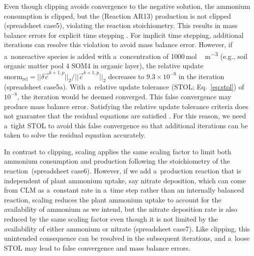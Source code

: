 \documentclass[gmdd, online, hvmath]{copernicus}
\begin{document}
      Even though clipping avoids convergence to the negative solution, the
      ammonium consumption is clipped, but the   (Reaction AR13) production is
      not clipped (spreadsheet case5), violating the reaction
      stoichiometry. This results in mass balance errors for explicit time
      stepping \citep{Tang2015}. For implicit time stepping, additional
      iterations can resolve this violation to avoid mass balance error.
      However, if a~nonreactive species is added with a~concentration of
      1000\,\unit{mol\,m^{-3}} (e.g., soil organic matter pool 4 SOM4 in
      organic layer), the relative update $\text{snorm}_{\text{rel}}= {\vert\vert
      \delta \vec{c}^{k+1,p} \vert\vert_2} / {\vert\vert \vec{c}^{k+1,p} \vert\vert
      _2}$ decreases to $9.3\times 10^{-9}$ in the iteration (spreadsheet
      case5a). With a~relative update tolerance (STOL; Eq.~\ref{eq:stol}) of
      $10^{-8}$, the iteration would be deemed converged. This false
      convergence may produce mass balance error. Satisfying the relative
      update tolerance criteria does not guarantee that the residual
      equations are satisfied \citep{Lichtner2015}. For this reason, we need
      a~tight STOL to avoid this false convergence so that additional
      iterations can be taken to solve the residual equation accurately.

      In contrast to clipping, scaling applies the same scaling factor to
      limit both ammonium consumption and  production following
      the stoichiometry of the reaction~(spreadsheet case6). However, if we
      add a~production reaction that is independent of plant ammonium
      uptake, say nitrate deposition, which can come from CLM as a~constant
      rate in a~time step rather than an internally balanced reaction,
      scaling reduces the plant ammonium uptake to account for the
      availability of ammonium as we intend, but the nitrate deposition rate
      is also reduced by the same scaling factor even though it is not
      limited by the availability of either ammonium or nitrate (spreadsheet
      case7). Like clipping, this unintended consequence can be resolved in
      the subsequent iterations, and a~loose STOL may lead to false
      convergence and mass balance errors.
\end{document}
